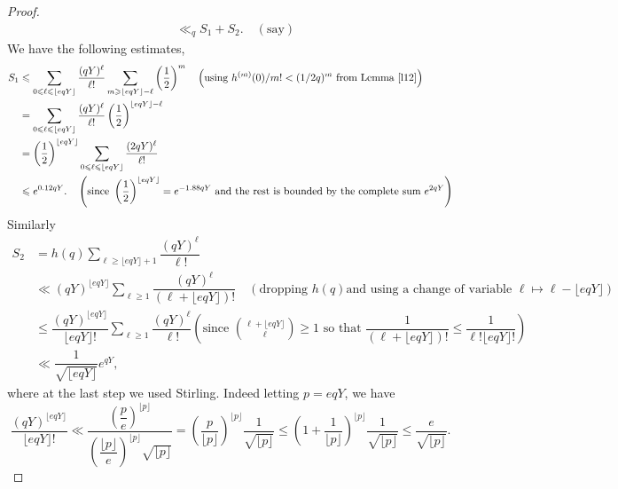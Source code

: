 \documentclass[12pt]{amsart}
\numberwithin{equation}{section}
\theoremstyle{remark}
\theoremstyle{remark}
\theoremstyle{definition}
\begin{document}
\begin{proof}
\begin{align}
\nonumber
&\ll_q S_1+S_2. \quad(\text{say})
\end{align}
We have the following estimates,
\begin{align}
\nonumber
S_1 &\leqslant \displaystyle\sum\limits_{0\leqslant \ell\leqslant\lfloor eqY\rfloor} \dfrac{(qY)^\ell}{\ell!} \sum\limits_{m\geqslant\lfloor eqY\rfloor-\ell}\left(\dfrac{1}{2}\right)^m \quad \left(\text{using }h^{(m)}(0)/m!<(1/2q)^m\text{ from Lemma \ref{l12}}\right)\\
\nonumber
&=\displaystyle\sum\limits_{0\leqslant \ell\leqslant\lfloor eqY\rfloor} \dfrac{(qY)^\ell}{\ell!}\left(\dfrac{1}{2}\right)^{\lfloor eqY\rfloor-\ell}\\
\nonumber
&=  \left(\dfrac{1}{2}\right)^{\lfloor eqY \rfloor}\displaystyle\sum\limits_{0\leqslant \ell\leqslant\lfloor eqY\rfloor} \dfrac{(2qY)^\ell}{\ell!}\\
\nonumber
&\leqslant e^{0.12qY}.\quad \left(\text{since }\left(\dfrac{1}{2}\right)^{\lfloor eqY \rfloor}=e^{-1.88qY}\text{ and the rest is bounded by the complete sum }e^{2qY}\right)
\end{align}
Similarly
\begin{align}
\nonumber
S_2 &=h(q) \displaystyle\sum\limits_{\ell\geqslant\lfloor eqY\rfloor+1} \dfrac{(qY)^\ell}{\ell!}\\
\nonumber
&\ll (qY)^{\lfloor eqY\rfloor}\displaystyle\sum\limits_{\ell\geqslant 1} \dfrac{(qY)^{\ell}}{\left(\ell+\lfloor eqY \rfloor\right)!}\quad\left(\text{dropping $h(q)$and using a change of variable }\ell\mapsto \ell-\lfloor eqY \rfloor\right)\\
\nonumber
&\leqslant \dfrac{(qY)^{\lfloor eqY\rfloor}}{\lfloor eqY \rfloor!}\displaystyle\sum\limits_{\ell\geqslant 1} \dfrac{(qY)^\ell}{\ell!} \left(\text{since } \displaystyle\binom{\ell+\lfloor eqY \rfloor}{\ell}\geqslant 1\text{ so that } \dfrac{1}{(\ell+\lfloor eqY \rfloor)!}\leqslant \dfrac{1}{\ell!\lfloor eqY \rfloor!}\right)\\
\nonumber
&\ll \dfrac{1}{\sqrt{\lfloor eqY \rfloor}}e^{qY},
\end{align}
where at the last step we used Stirling. Indeed letting $p=eqY $, we have
$$\dfrac{(qY)^{\lfloor eqY\rfloor}}{\lfloor eqY \rfloor!}\ll \dfrac{\left( \dfrac{p}{e}\right)^{\lfloor p\rfloor}}{\left( \dfrac{\lfloor p \rfloor}{e}\right)^{\lfloor p \rfloor}\sqrt{\lfloor p \rfloor}}=\left( \dfrac{p}{\lfloor p \rfloor}\right)^{\lfloor p \rfloor}\dfrac{1}{\sqrt{\lfloor p \rfloor}}\leqslant \left(1+\dfrac{1}{\lfloor p \rfloor} \right)^{\lfloor p \rfloor}\dfrac{1}{\sqrt{\lfloor p \rfloor}}\leqslant \dfrac{e}{\sqrt{\lfloor p \rfloor}}.$$
\end{proof}
\end{document}
